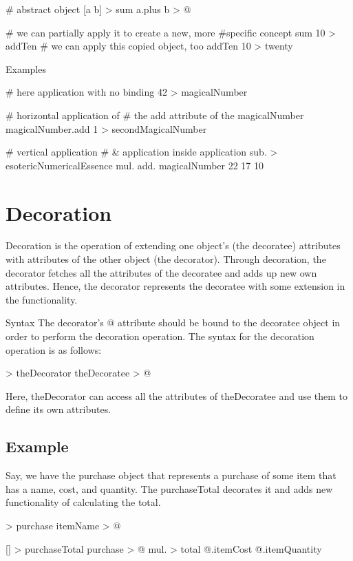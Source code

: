 \documentclass[12pt]{book}
\begin{document}
\begin{ffcode}
# abstract object
[a b] > sum
  a.plus b > @

# we can partially apply it to create a new, more
#specific concept
sum 10 > addTen
# we can apply this copied object, too
addTen 10 > twenty
\end{ffcode}

Examples
\begin{ffcode}
# here application with no binding
42 > magicalNumber

# horizontal application of 
# the add attribute of the magicalNumber
magicalNumber.add 1 > secondMagicalNumber

# vertical application
# & application inside application
sub. > esotericNumericalEssence
  mul.
    add.
      magicalNumber
      22
    17
  10
\end{ffcode}

\section{Decoration}
Decoration is the operation of extending one object's (the decoratee) attributes with attributes of the other object (the decorator). Through decoration, the decorator fetches all the attributes of the decoratee and adds up new own attributes. Hence, the decorator represents the decoratee with some extension in the functionality.

Syntax
The decorator's @ attribute should be bound to the decoratee object in order to perform the decoration operation.
The syntax for the decoration operation is as follows:

\begin{ffcode}
[] > theDecorator
  theDecoratee > @
\end{ffcode}
Here, theDecorator can access all the attributes of theDecoratee and use them to define its own attributes.

\subsection{Example}
Say, we have the purchase object that represents a purchase of some item that has a name, cost, and quantity. The purchaseTotal decorates it and adds new functionality of calculating the total.

\begin{ffcode}
 > purchase
  itemName > @

[] > purchaseTotal
  purchase > @
  mul. > total
    @.itemCost
    @.itemQuantity
\end{ffcode}
\end{document}
